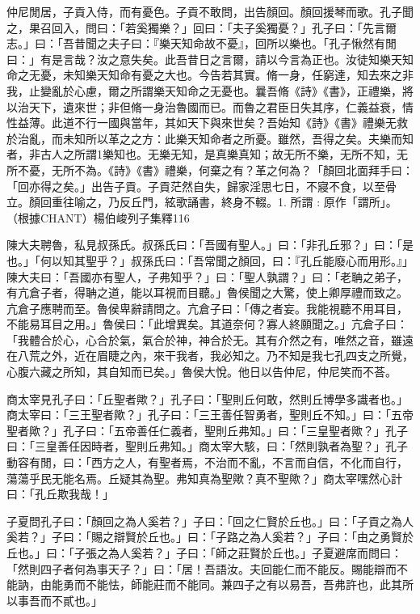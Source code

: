 
\begin{pinyinscope}
仲尼閒居，子貢入侍，而有憂色。子貢不敢問，出告顏回。顏回援琴而歌。孔子聞之，果召回入，問曰：「若奚獨樂？」回曰：「夫子奚獨憂？」孔子曰：「先言爾志。」曰：「吾昔聞之夫子曰：『樂天知命故不憂』，回所以樂也。「孔子愀然有閒曰：」有是言哉？汝之意失矣。此吾昔日之言爾，請以今言為正也。汝徒知樂天知命之无憂，未知樂天知命有憂之大也。今告若其實。脩一身，任窮達，知去來之非我，止變亂於心慮，爾之所謂樂天知命之无憂也。曩吾脩《詩》《書》，正禮樂，將以治天下，遺來世；非但脩一身治魯國而已。而魯之君臣日失其序，仁義益衰，情性益薄。此道不行一國與當年，其如天下與來世矣？吾始知《詩》《書》禮樂无救於治亂，而未知所以革之之方：此樂天知命者之所憂。雖然，吾得之矣。夫樂而知者，非古人之所謂1樂知也。无樂无知，是真樂真知；故无所不樂，无所不知，无所不憂，无所不為。《詩》《書》禮樂，何棄之有？革之何為？「顏回北面拜手曰：「回亦得之矣。」出告子貢。子貢茫然自失，歸家淫思七日，不寢不食，以至骨立。顏回重往喻之，乃反丘門，絃歌誦書，終身不輟。1. 所謂 : 原作「謂所」。（根據CHANT）楊伯峻列子集釋116

陳大夫聘魯，私見叔孫氏。叔孫氏曰：「吾國有聖人。」曰：「非孔丘邪？」曰：「是也。」「何以知其聖乎？」叔孫氏曰：「吾常聞之顏回，曰：『孔丘能廢心而用形。』」陳大夫曰：「吾國亦有聖人，子弗知乎？」曰：「聖人孰謂？」曰：「老聃之弟子，有亢倉子者，得聃之道，能以耳視而目聽。」魯侯聞之大驚，使上卿厚禮而致之。亢倉子應聘而至。魯侯卑辭請問之。亢倉子曰：「傳之者妄。我能視聽不用耳目，不能易耳目之用。」魯侯曰：「此增異矣。其道奈何？寡人終願聞之。」亢倉子曰：「我體合於心，心合於氣，氣合於神，神合於无。其有介然之有，唯然之音，雖遠在八荒之外，近在眉睫之內，來干我者，我必知之。乃不知是我七孔四支之所覺，心腹六藏之所知，其自知而已矣。」魯侯大悅。他日以告仲尼，仲尼笑而不荅。

商太宰見孔子曰：「丘聖者歟？」孔子曰：「聖則丘何敢，然則丘博學多識者也。」商太宰曰：「三王聖者歟？」孔子曰：「三王善任智勇者，聖則丘不知。」曰：「五帝聖者歟？」孔子曰：「五帝善任仁義者，聖則丘弗知。」曰：「三皇聖者歟？」孔子曰：「三皇善任因時者，聖則丘弗知。」商太宰大駭，曰：「然則孰者為聖？」孔子動容有閒，曰：「西方之人，有聖者焉，不治而不亂，不言而自信，不化而自行，蕩蕩乎民无能名焉。丘疑其為聖。弗知真為聖歟？真不聖歟？」商太宰嘿然心計曰：「孔丘欺我哉！」

子夏問孔子曰：「顏回之為人奚若？」子曰：「回之仁賢於丘也。」曰：「子貢之為人奚若？」子曰：「賜之辯賢於丘也。」曰：「子路之為人奚若？」子曰：「由之勇賢於丘也。」曰：「子張之為人奚若？」子曰：「師之莊賢於丘也。」子夏避席而問曰：「然則四子者何為事天子？」曰：「居！吾語汝。夫回能仁而不能反。賜能辯而不能訥，由能勇而不能怯，師能莊而不能同。兼四子之有以易吾，吾弗許也，此其所以事吾而不貳也。」


\end{pinyinscope}
